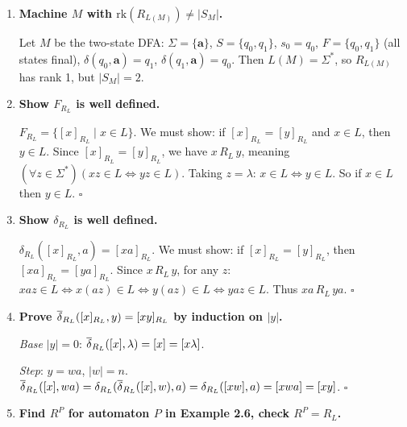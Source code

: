 \begin{enumerate}[{2.}1.]
$L$ is a finite set, hence FAD. Nerode's theorem says $L$ is FAD iff $R_L$ has finite rank, not iff $I$ (or any other right congruence) has finite rank. Here $R_L$ has rank equal to the number of $R_L$-classes, which is finite (since $L$ is finite and FAD). The fact that $I$ has infinite rank is irrelevant -- we need $I$ to \emph{refine} $R_L$ (which it does, trivially, since $I$ is the finest relation), but Nerode's theorem requires $R_L$ itself to have finite rank. $\square$

\item \textbf{Machine $M$ with $\mathrm{rk}(R_{L(M)})\neq |S_M|$.}

Let $M$ be the two-state DFA: $\Sigma=\{\mathbf{a}\}$, $S=\{q_0,q_1\}$, $s_0=q_0$, $F=\{q_0,q_1\}$ (all states final), $\delta(q_0,\mathbf{a})=q_1$, $\delta(q_1,\mathbf{a})=q_0$. Then $L(M)=\Sigma^*$, so $R_{L(M)}$ has rank 1, but $|S_M|=2$.

\item \textbf{Show $F_{R_L}$ is well defined.}

$F_{R_L}=\{[x]_{R_L}\mid x\in L\}$. We must show: if $[x]_{R_L}=[y]_{R_L}$ and $x\in L$, then $y\in L$. Since $[x]_{R_L}=[y]_{R_L}$, we have $x\,R_L\,y$, meaning $(\forall z\in\Sigma^*)(xz\in L\Leftrightarrow yz\in L)$. Taking $z=\lambda$: $x\in L\Leftrightarrow y\in L$. So if $x\in L$ then $y\in L$. $\square$

\item \textbf{Show $\delta_{R_L}$ is well defined.}

$\delta_{R_L}([x]_{R_L}, a) = [xa]_{R_L}$. We must show: if $[x]_{R_L}=[y]_{R_L}$, then $[xa]_{R_L}=[ya]_{R_L}$. Since $x\,R_L\,y$, for any $z$: $xaz\in L\Leftrightarrow x(az)\in L\Leftrightarrow y(az)\in L\Leftrightarrow yaz\in L$. Thus $xa\,R_L\,ya$. $\square$

\item \textbf{Prove $\overline{\delta}_{R_L}([x]_{R_L},y)=[xy]_{R_L}$ by induction on $|y|$.}

\textit{Base} $|y|=0$: $\overline{\delta}_{R_L}([x],\lambda)=[x]=[x\lambda]$. \checkmark

\textit{Step}: $y=wa$, $|w|=n$. $\overline{\delta}_{R_L}([x],wa)=\delta_{R_L}(\overline{\delta}_{R_L}([x],w),a)=\delta_{R_L}([xw],a)=[xwa]=[xy]$. $\square$

\item \textbf{Find $R^P$ for automaton $P$ in Example 2.6, check $R^P=R_L$.}


\end{enumerate}
